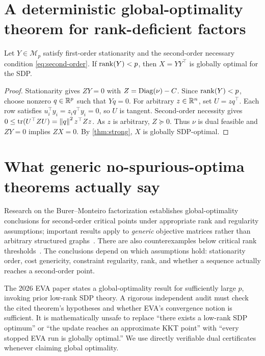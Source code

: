 \section{A deterministic global-optimality theorem for rank-deficient factors}
\begin{theorem}\label{thm:rankdef}
Let $Y\in\mathcal M_p$ satisfy first-order stationarity and the second-order necessary condition \eqref{eq:second-order}. If $\operatorname{rank}(Y)<p$, then $X=YY^\top$ is globally optimal for the SDP.
\end{theorem}
\begin{proof}
Stationarity gives $ZY=0$ with $Z=\operatorname{Diag}(\nu)-C$. Since $\operatorname{rank}(Y)<p$, choose nonzero $q\in\mathbb{R}^p$ such that $Yq=0$. For arbitrary $z\in\mathbb{R}^n$, set $U=zq^\top$. Each row satisfies $u_i^\top y_i=z_iq^\top y_i=0$, so $U$ is tangent. Second-order necessity gives $0\le\operatorname{tr}(U^\top ZU)=\left\lVert q\right\rVert^2z^\top Zz$. As $z$ is arbitrary, $Z\succeq0$. Thus $\nu$ is dual feasible and $ZY=0$ implies $ZX=0$. By \cref{thm:strong}, $X$ is globally SDP-optimal.
\end{proof}

\section{What generic no-spurious-optima theorems actually say}
Research on the Burer--Monteiro factorization establishes global-optimality conclusions for second-order critical points under appropriate rank and regularity assumptions; important results apply to \emph{generic} objective matrices rather than arbitrary structured graphs~\cite{boumal2016,boumal2020}. There are also counterexamples below critical rank thresholds~\cite{waldspurger2020}. The conclusions depend on which assumptions hold: stationarity order, cost genericity, constraint regularity, rank, and whether a sequence actually reaches a second-order point.

\begin{caution}
The 2026 EVA paper states a global-optimality result for sufficiently large $p$, invoking prior low-rank SDP theory. A rigorous independent audit must check the cited theorem's hypotheses and whether EVA's convergence notion is sufficient. It is mathematically unsafe to replace ``there exists a low-rank SDP optimum'' or ``the update reaches an approximate KKT point'' with ``every stopped EVA run is globally optimal.'' We use directly verifiable dual certificates whenever claiming global optimality.
\end{caution}
